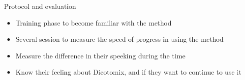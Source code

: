 \documentclass[graphics]{beamer}
\begin{document}
\begin{frame}{Protocol and evaluation}
	\begin{itemize}
		\item Training phase to become familiar with the method
		\item Several session to measure the speed of progress in using the method
		\item Measure the difference in their speeking during the time
		\item Know their feeling about Dicotomix, and if they want to continue to use it
	\end{itemize}
\end{frame}
\end{document}
